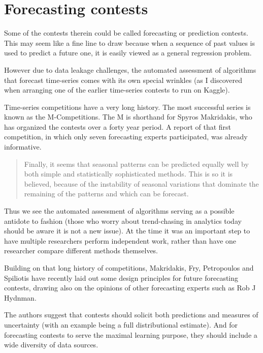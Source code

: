 \section{Forecasting contests}


Some of the contests therein could be called forecasting or prediction contests. This may seem like a fine line to draw because when a sequence of past values is used to predict a future one, it is easily viewed as a general regression problem. 


However due to data leakage challenges, the automated assessment of algorithms that forecast time-series comes with its own special wrinkles (as I discovered when arranging one of the earlier time-series contests to run on Kaggle). 


Time-series competitions have a very long history. The most successful series is known as the M-Competitions. The M is shorthand for Spyros Makridakis, who has organized the contests over a forty year period. A report of that first competition, in which only seven forecasting experts participated, was already informative. 
\begin{quote}{\cite{Makridakis1979AccuracyInvestigation}}
   Finally, it seems that seasonal patterns can be predicted equally well by both
simple and statistically sophisticated methods. This is so it is believed, because of the instability of
seasonal variations that dominate the remaining of the patterns and which can be forecast.
\end{quote}
Thus we see the automated assessment of algorithms serving as a possible antidote to fashion (those who worry about trend-chasing in analytics today should be aware it is not a new issue). At the time it was an important step to have multiple researchers perform independent work, rather than have one researcher compare different methods themselves. 

Building on that long history of competitions, Makridakis, Fry, Petropoulos and Spiliotis have recently laid out some design principles for future forecasting contests, drawing also on the opinions of other forecasting experts such as Rob J Hydnman. 


The authors suggest that contests should solicit both predictions and measures of uncertainty (with an example being a full distributional estimate). And for forecasting contests to serve the maximal learning purpose, they should include a wide diversity of data sources. 

